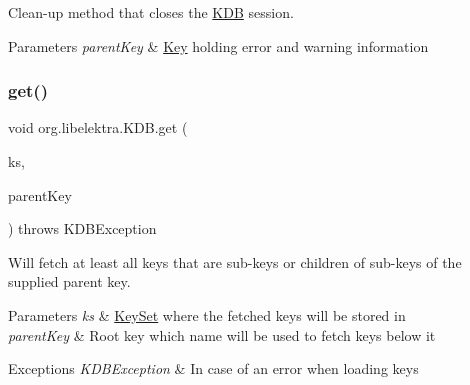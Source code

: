 Clean-\/up method that closes the \hyperlink{classorg_1_1libelektra_1_1KDB}{K\+DB} session. 


\begin{DoxyParams}{Parameters}
{\em parent\+Key} & \hyperlink{classorg_1_1libelektra_1_1Key}{Key} holding error and warning information \\
\hline
\end{DoxyParams}
\mbox{\label{classorg_1_1libelektra_1_1KDB_ac3b5b3551a9fef5dae1fb468e74272f6}} 
\subsubsection{\texorpdfstring{get()}{get()}\hspace{0.1cm}{\footnotesize\ttfamily [1/2]}}
{\footnotesize\ttfamily void org.\+libelektra.\+K\+D\+B.\+get (\begin{DoxyParamCaption}\item[{final \hyperlink{classorg_1_1libelektra_1_1KeySet}{Key\+Set}}]{ks,  }\item[{final \hyperlink{classorg_1_1libelektra_1_1Key}{Key}}]{parent\+Key }\end{DoxyParamCaption}) throws K\+D\+B\+Exception\hspace{0.3cm}{\ttfamily [inline]}}



Will fetch at least all keys that are sub-\/keys or children of sub-\/keys of the supplied parent key. 


\begin{DoxyParams}{Parameters}
{\em ks} & \hyperlink{classorg_1_1libelektra_1_1KeySet}{Key\+Set} where the fetched keys will be stored in \\
\hline
{\em parent\+Key} & Root key which name will be used to fetch keys below it \\
\hline
\end{DoxyParams}

\begin{DoxyExceptions}{Exceptions}
{\em K\+D\+B\+Exception} & In case of an error when loading keys \\
\hline
\end{DoxyExceptions}
\mbox{\label{classorg_1_1libelektra_1_1KDB_a600abc786bde91a3122bd96be991a3d5}} 
